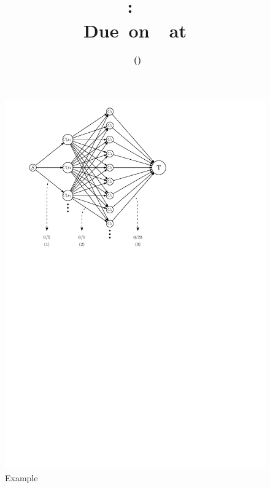 \documentclass[11pt,letterpaper,titlepage,en-US]{article}
\title{
    \vspace{2in}
    \textmd{\textbf{\hmwkClassName \\\hmwkClass:\ \hmwkTitle}}\\
    \normalsize\vspace{0.1in}\small{Due\ on\ \DTMusedate{DueDate}\ at \DTMusetime{DueDate} }\\
    \vspace{0.1in}\large{\textit{\hmwkClassInstructor}}
    \vspace{3in}
}
\author{\textbf{\hmwkAuthorName\ \footnotesize{(\hmwkAuthorNetID)}} \\  \hmwkAuthorUTDEmail}
\date{}
\begin{document}
\maketitle


\tableofcontents

\pagebreak
{}


\begin{homeworkProblem}
\begin{homeworkSubProblem}

\begin{figure}[ht!]
    \caption{Example}\label{p4a}
    \centering
    \includegraphics[width=.8\textwidth]{p4a}
\end{figure}
\end{homeworkSubProblem}
\end{homeworkProblem}
\end{document}
